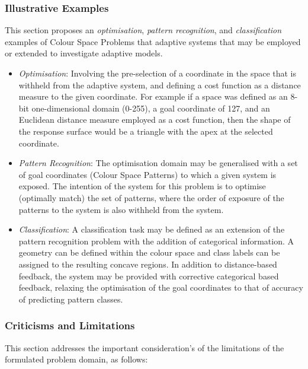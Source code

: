 %
%
\subsubsection{Illustrative Examples}
This section proposes an \emph{optimisation}, \emph{pattern recognition}, and \emph{classification} examples of Colour Space Problems that adaptive systems that may be employed or extended to investigate adaptive models. 

\begin{itemize}
	\item \emph{Optimisation}: Involving the pre-selection of a coordinate in the space that is withheld from the adaptive system, and defining a cost function as a distance measure to the given coordinate. For example if a space was defined as an 8-bit one-dimensional domain (0-255), a goal coordinate of 127, and an Euclidean distance measure employed as a cost function, then the shape of the response surface would be a triangle with the apex at the selected coordinate. 
	\item \emph{Pattern Recognition}: The optimisation domain may be generalised with a set of goal coordinates (Colour Space Patterns) to which a given system is exposed. The intention of the system for this problem is to optimise (optimally match) the set of patterns, where the order of exposure of the patterns to the system is also withheld from the system.
	\item \emph{Classification}: A classification task may be defined as an extension of the pattern recognition problem with the addition of categorical information. A geometry can be defined within the colour space and class labels can be assigned to the resulting concave regions. In addition to distance-based feedback, the system may be provided with corrective categorical based feedback, relaxing the optimisation of the goal coordinates to that of accuracy of predicting pattern classes.
\end{itemize}


%
%
\subsubsection{Criticisms and Limitations}
This section addresses the important consideration's of the limitations of the formulated problem domain, as follows:

